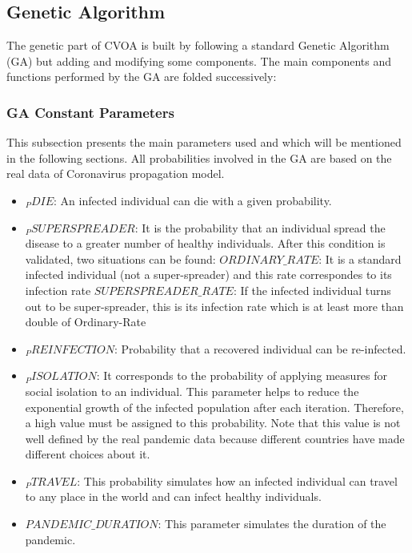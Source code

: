 \documentclass[letterpaper]{article}%
\begin{document}
\subsection{Genetic Algorithm}
	The genetic part of CVOA is built by following a standard Genetic Algorithm (GA) but adding and modifying some components.
The main components and functions performed by the GA are folded successively:

\subsubsection{GA Constant Parameters}
This subsection presents the main parameters used and which will be mentioned in the following sections.
All probabilities involved in the GA are based on the real data of Coronavirus propagation model.
\begin{itemize}
\item $_PDIE$: An infected individual can die with a given probability.
\item $_PSUPERSPREADER$: It is the probability that an individual spread the disease to a greater number of healthy individuals. After this condition is validated, two situations can be found: %
\subitem $ORDINARY\_RATE$: It is a standard infected individual (not a super-spreader) and this rate correspondes to its infection rate
\subitem $SUPERSPREADER\_RATE$: If the infected individual turns out to be super-spreader, this is its infection rate which is at least more than double of Ordinary-Rate
\item $_PREINFECTION$: Probability that a recovered individual can be re-infected.
\item $_PISOLATION$: It corresponds to the probability of applying measures for social isolation to an individual. This parameter helps to reduce the exponential growth of the infected population after each iteration. Therefore, a high value must be assigned to this probability. Note that this value is not well defined by the real pandemic data because different countries have made different choices about it. 
\item $_PTRAVEL$: This probability simulates how an infected individual can travel to any place in the world and can infect healthy individuals.
\item $PANDEMIC\_DURATION$: This parameter simulates the duration of the pandemic.
\end{itemize}
\end{document}
